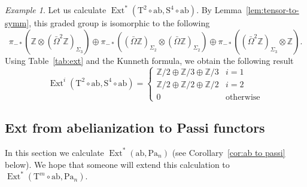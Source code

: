 \documentclass[psamsfonts]{amsart}
\theoremstyle{plain}
\theoremstyle{definition}
\theoremstyle{remark}
\newtheorem{exmp}[thm]{Example}
\newcommand{\Z}{\mathbb{Z}}
\newcommand{\abelianization}{\mathrm{ab}}
\newcommand{\tensor}{\mathrm{T}}
\newcommand{\symm}{\mathrm{S}}
\newcommand{\Passi}{\mathrm{Pa}}
\DeclareMathOperator{\ext}{Ext}
\begin{document}
\begin{exmp}
Let us calculate $\ext^*\left(\tensor^2\circ \abelianization, \symm^4\circ\abelianization\right)$. By Lemma~\ref{lem:tensor-to-symm}, this graded group is isomorphic to the following
\[
\pi_{-*}\left( \Z\otimes(\bar\Omega^{2} \Z)_{\Sigma_{3}}\right)\oplus \pi_{-*}\left( (\bar\Omega \Z)_{\Sigma_{2}}\otimes(\bar\Omega \Z)_{\Sigma_{2}}\right)\oplus \pi_{-*}\left( (\bar\Omega^{2} \Z)_{\Sigma_{3}}\otimes \Z\right).
\]
Using Table~\ref{tab:ext} and the Kunneth formula, we obtain the following result
\[
\ext^i(\tensor^2\circ \abelianization, \symm^4 \circ\abelianization)=\left\{\begin{array}{cc}
    \Z/2\oplus \Z/3\oplus\Z/3 & i=1 \\
    \Z/2\oplus \Z/2 \oplus \Z/2 & i=2 \\
    0 & \mbox{otherwise}
\end{array}\right.
\]
\end{exmp}
\subsection{Ext from abelianization to Passi functors}\label{section:ab to Passi}
In this section we calculate $\ext^*(\abelianization, \Passi_n)$ (see Corollary~\ref{cor:ab to passi} below).
We hope that someone will extend this calculation to $\ext^*(\tensor^m \circ \abelianization, \Passi_n)$.
\end{document}
